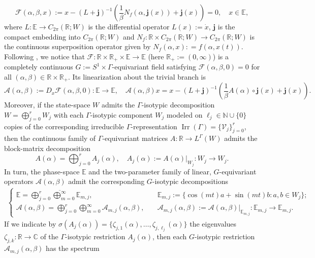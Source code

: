 \documentclass[twoside,11pt]{article}
\def\bc{{\mathbb{C}}}
\def\bn{{\mathbb{N}}}
\def\br{{\mathbb{R}}}
\begin{document}
\begin{equation}\label{eq:example_operator_equation}
    \mathscr{F}(\alpha, \beta, x) := x - (L + \bm{j})^{-1}\left(\frac{1}{\beta}N_f(\alpha, \bm{j}(x)) + \bm{j}(x)\right) = 0, \quad x \in \mathbb{E},
\end{equation}
where $L: \mathbb E \to C_{2\pi}(\br; W)$ is the differential operator $L(x) := \dot{x}$, $\bm{j}$ is the compact embedding into $C_{2\pi}(\br; W)$ and $N_f: \br \times C_{2\pi}(\br; W) \to C_{2\pi}(\br; W)$ is the continuous superposition operator given by $N_f(\alpha, x) : = f(\alpha,x(t))$. Following \cite{book-new}, we notice that $\mathscr F: \br \times \br_+ \times \mathbb E \to \mathbb E$ (here $\br_+ := (0,\infty)$) is a completely continuous $G:= S^1 \times \Gamma$-equivariant field satisfying $\mathscr F(\alpha,\beta,0) = 0$ for all $(\alpha,\beta) \in \br \times \br_+$. Its linearization about the trivial branch is 
\[
\mathscr A(\alpha,\beta) := D_x \mathscr F(\alpha,\beta,0) : \mathbb E \to \mathbb E, \quad \mathscr A(\alpha,\beta)x = x - (L + \bm{j})^{-1}\left(\frac{1}{\beta}A(\alpha) \circ \bm j(x) + \bm{j}(x)\right).
\]
Moreover, if the state-space $W$ admits the $\Gamma$-isotypic decomposition $W = \bigoplus_{j=0}^r W_j$ with each $\Gamma$-isotypic component $W_j$ modeled on $\ell_j \in \bn \cup \{0\}$ copies of the corresponding irreducible $\Gamma$-representation $\operatorname{Irr}(\Gamma) = \{ \mathcal V_j \}_{j=0}^r$, then the continuous family of $\Gamma$-equivariant matrices $A: \br \to L^\Gamma(W)$ admits the block-matrix decomposition 
\[
A(\alpha) = \bigoplus_{j=0}^r A_j(\alpha), \quad  A_j(\alpha):= A(\alpha)|_{W_j}: W_j \to W_j.
\]
In turn, the phase-space $\mathbb E$ and the two-parameter family of linear, $G$-equivariant operators $\mathscr A(\alpha,\beta)$ admit the corresponding $G$-isotypic decompositions
\begin{align*}
    \begin{cases}
       \mathbb E = \overline{\bigoplus_{j=0}^r \bigoplus_{m=0}^\infty \mathbb E_{m,j}}, \quad &\mathbb E_{m,j}:= \{ \cos(mt)a + \sin(mt) b : a,b \in W_j \};  \\
       \mathscr A(\alpha,\beta) = \bigoplus_{j=0}^r \bigoplus_{m=0}^\infty \mathscr A_{m,j}(\alpha,\beta), \quad &\mathscr A_{m,j}(\alpha,\beta) := \mathscr A(\alpha,\beta)|_{\mathbb E_{m,j}} : \mathbb E_{m,j} \to \mathbb E_{m,j}.
    \end{cases}
\end{align*}
If we indicate by $\sigma(A_j(\alpha)) = \{ \zeta_{j,1}(\alpha), \ldots , \zeta_{j, \ell_j}(\alpha) \}$ the eigenvalues $\zeta_{j,k}: \br \to \bc$ of the $\Gamma$-isotypic restriction $A_j(\alpha)$, then each $G$-isotypic restriction $\mathscr A_{m,j}(\alpha,\beta)$ has the spectrum
\end{document}
